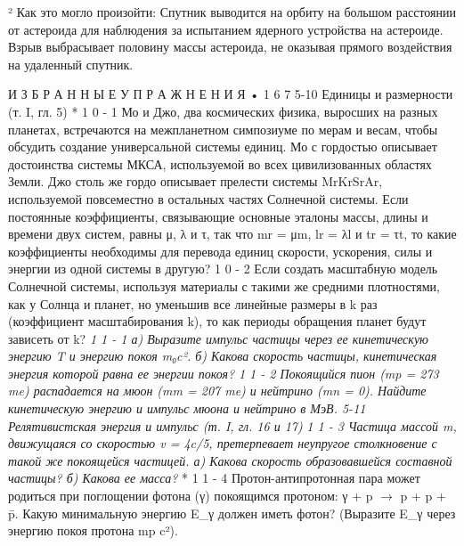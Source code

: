 \documentclass[11pt,oneside]{article}
\begin{document}
² Как это могло произойти: Спутник выводится на орбиту на большом расстоянии от астероида для наблюдения за испытанием ядерного устройства на астероиде. Взрыв выбрасывает половину массы астероида, не оказывая прямого воздействия на удаленный спутник.\par



И З Б Р А Н Н Ы Е  У П Р А Ж Н Е Н И Я • 1 6 7 5-10 Единицы и размерности (т. I, гл. 5) * 1 0 - 1 Мо и Джо, два космических физика, выросших на разных планетах, встречаются на межпланетном симпозиуме по мерам и весам, чтобы обсудить создание универсальной системы единиц. Мо с гордостью описывает достоинства системы МКСА, используемой во всех цивилизованных областях Земли. Джо столь же гордо описывает прелести системы MrKrSrAr, используемой повсеместно в остальных частях Солнечной системы. Если постоянные коэффициенты, связывающие основные эталоны массы, длины и времени двух систем, равны μ, λ и τ, так что mr = μm, lr = λl и tr = τt, то какие коэффициенты необходимы для перевода единиц скорости, ускорения, силы и энергии из одной системы в другую? \emph{ } 1 0 - 2 Если создать масштабную модель Солнечной системы, используя материалы с такими же средними плотностями, как у Солнца и планет, но уменьшив все линейные размеры в k раз (коэффициент масштабирования k), то как периоды обращения планет будут зависеть от k? \emph{ 1 1 - 1 а) Выразите импульс частицы через ее кинетическую энергию T и энергию покоя m₀c². б) Какова скорость частицы, кинетическая энергия которой равна ее энергии покоя? } \emph{ 1 1 - 2 Покоящийся пион (mp = 273 me) распадается на мюон (mm = 207 me) и нейтрино (mn = 0). Найдите кинетическую энергию и импульс мюона и нейтрино в МэВ. 5-11 Релятивистская энергия и импульс (т. I, гл. 16 и 17) } \emph{ 1 1 - 3 Частица массой m, движущаяся со скоростью v = 4c/5, претерпевает неупругое столкновение с такой же покоящейся частицей. а) Какова скорость образовавшейся составной частицы? б) Какова ее масса? } * 1 1 - 4 Протон-антипротонная пара может родиться при поглощении фотона (γ) покоящимся протоном: γ + p \ensuremath{\to} p + p + p̄. Какую минимальную энергию E\_γ должен иметь фотон? (Выразите E\_γ через энергию покоя протона mp c²).\par
\end{document}
